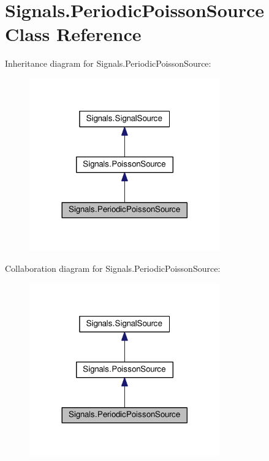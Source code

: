 \hypertarget{classSignals_1_1PeriodicPoissonSource}{}\section{Signals.\+Periodic\+Poisson\+Source Class Reference}
\label{classSignals_1_1PeriodicPoissonSource}


Inheritance diagram for Signals.\+Periodic\+Poisson\+Source\+:\nopagebreak
\begin{figure}[H]
\begin{center}
\leavevmode
\includegraphics[width=233pt]{classSignals_1_1PeriodicPoissonSource__inherit__graph}
\end{center}
\end{figure}


Collaboration diagram for Signals.\+Periodic\+Poisson\+Source\+:\nopagebreak
\begin{figure}[H]
\begin{center}
\leavevmode
\includegraphics[width=233pt]{classSignals_1_1PeriodicPoissonSource__coll__graph}
\end{center}
\end{figure}
